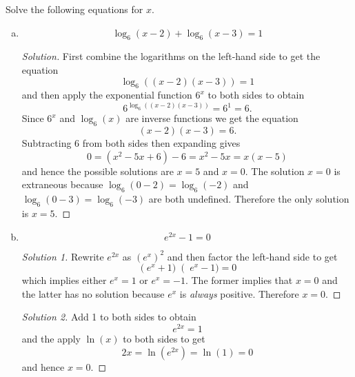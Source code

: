\documentclass[12pt]{amsart}
\begin{document}
\begin{thm}[20 Points]\label{ex5}
  Solve the following equations for $x$.
  \begin{enumerate}[(a)]
  \item
    $$ \log_6(x-2) + \log_6(x - 3) = 1$$
    \begin{proof}[Solution]
      First combine the logarithms on the left-hand side to get the equation
      $$\log_6\left((x - 2)(x - 3)\right) = 1$$
      and then apply the exponential function $6^x$ to both sides to obtain
      $$6^{\log_6\left((x - 2)(x - 3)\right)} = 6^1 = 6.$$
      Since $6^x$ and $\log_6(x)$ are inverse functions we get the equation
      $$(x - 2)(x - 3) = 6.$$
      Subtracting 6 from both sides then expanding gives
      $$0 = (x^2 - 5x + 6) - 6 = x^2 - 5x = x(x - 5)$$
      and hence the possible solutions are $x = 5$ and $x = 0$.
      The solution $x = 0$ is extraneous because $\log_6(0 - 2) = \log_6(-2)$ and $\log_6(0 - 3) = \log_6(-3)$ are both undefined.
      Therefore the only solution is $x = 5$.
    \end{proof}
  \item
    $$e^{2x} - 1 = 0$$
    \begin{proof}[Solution 1]
      Rewrite $e^{2x}$ as $\left(e^x\right)^2$ and then factor the left-hand side to get
      $$\left(e^x + 1)\right(e^x - 1) = 0$$
      which implies either $e^x = 1$ or $e^x = -1$.
      The former implies that $x = 0$ and the latter has no solution because $e^x$ is {\it always} positive.
      Therefore $x = 0$.
    \end{proof}
    \begin{proof}[Solution 2]
      Add 1 to both sides to obtain
      $$e^{2x} = 1$$
      and the apply $\ln(x)$ to both sides to get
      $$2x = \ln(e^{2x}) = \ln(1) = 0$$
      and hence $x = 0$.
    \end{proof}
  \end{enumerate}
\end{thm}
\end{document}
